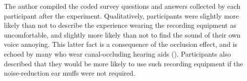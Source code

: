 The author compiled the coded survey questions %
and answers collected by each participant after the experiment. %
Qualitatively, participants were slightly more likely than not to describe the experience wearing the recording equipment as uncomfortable, and slightly more likely than not to find the sound of their own voice annoying.  This latter fact is a consequence of the occlusion effect, and is echoed by many who wear canal-occluding hearing aids (\cite{hansen:97a}).  Participants also described that they would be more likely to use such recording equipment if the noise-reduction ear muffs were not required.


